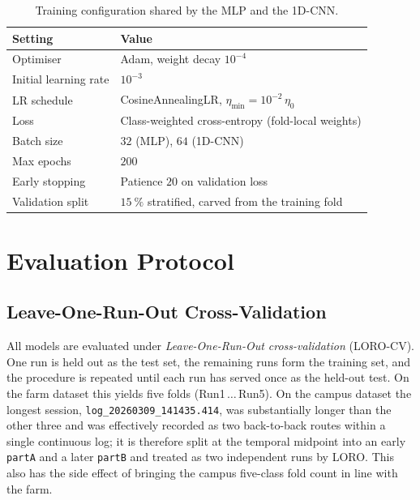 \begin{table}[H]
\centering
\label{tab:nn_training}
\begin{tabular}{ll}
\toprule
\textbf{Setting} & \textbf{Value} \\
\midrule
Optimiser            & Adam, weight decay $10^{-4}$~\cite{Kingma2014} \\
Initial learning rate & $10^{-3}$ \\
LR schedule          & CosineAnnealingLR, $\eta_{\min} = 10^{-2}\,\eta_0$ \\
Loss                 & Class-weighted cross-entropy (fold-local weights) \\
Batch size           & $32$ (MLP), $64$ (1D-CNN) \\
Max epochs           & $200$ \\
Early stopping       & Patience $20$ on validation loss \\
Validation split     & $\SI{15}{\percent}$ stratified, carved from the training fold \\
\bottomrule
\end{tabular}
\caption{Training configuration shared by the MLP and the 1D-CNN.}
\end{table}

\section{Evaluation Protocol}
\label{sec:eval_protocol}

\subsection{Leave-One-Run-Out Cross-Validation}

All models are evaluated under \emph{Leave-One-Run-Out cross-validation} (LORO-CV). One run is held out as the test set, the remaining runs form the training set, and the procedure is repeated until each run has served once as the held-out test. On the farm dataset this yields five folds (Run1\,$\ldots$\,Run5). On the campus dataset the longest session, \texttt{log\_20260309\_141435.414}, was substantially longer than the other three and was effectively recorded as two back-to-back routes within a single continuous log; it is therefore split at the temporal midpoint into an early \texttt{partA} and a later \texttt{partB} and treated as two independent runs by LORO. This also has the side effect of bringing the campus five-class fold count in line with the farm.

